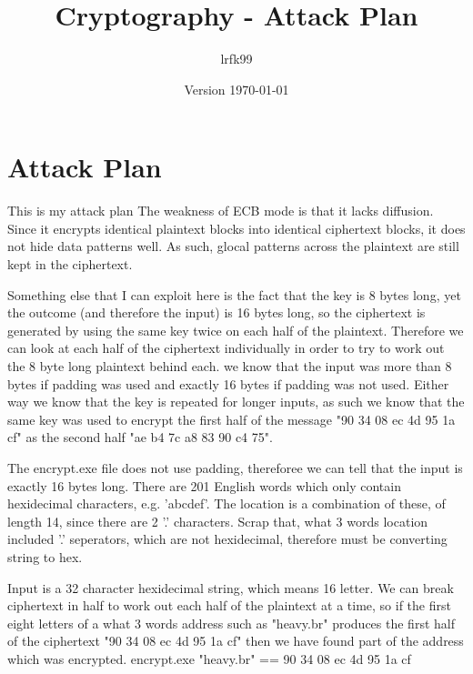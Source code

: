 \documentclass[a4paper, 11pt]{article}
\title{Cryptography - Attack Plan}
\date{Version \today}
\author{lrfk99}
\begin{document}
\maketitle

\section{Attack Plan}

This is my attack plan
The weakness of ECB mode is that it lacks diffusion. Since it encrypts identical plaintext blocks into 
identical ciphertext blocks, it does not hide data patterns well. 
As such, glocal patterns across the plaintext are still kept in the ciphertext.

Something else that I can exploit here is the fact that the key is 8 bytes long, 
yet the outcome (and therefore the input) is 16 bytes long, 
so the ciphertext is generated by using the same key twice on each half of the plaintext.
Therefore we can look at each half of the ciphertext individually in order to try to work out the 8 byte long plaintext behind each.
we know that the input was more than 8 bytes if padding was used 
and exactly 16 bytes if padding was not used.
Either way we know that the key is repeated for longer inputs, as such we know that the same key was used to 
encrypt the first half of the message "90 34 08 ec 4d 95 1a cf" as the second half "ae b4 7c a8 83 90 c4 75".

The encrypt.exe file does not use padding, thereforee we can tell that the input is exactly 16 bytes long.
There are 201 English words which only contain hexidecimal characters, e.g. 'abcdef'. The location is a combination of these, 
of length 14, since there are 2 '.' characters.
Scrap that, what 3 words location included '.' seperators, which are not hexidecimal, therefore must be converting string to hex.


Input is a 32 character hexidecimal string, which means 16 letter.
We can break ciphertext in half to work out each half of the plaintext at a time, so if the first eight letters of a what 3 words 
address such as "heavy.br" produces the first half of the ciphertext "90 34 08 ec 4d 95 1a cf" then we have found part of the 
address which was encrypted.
encrypt.exe "heavy.br" == 90 34 08 ec 4d 95 1a cf 
\end{document}
